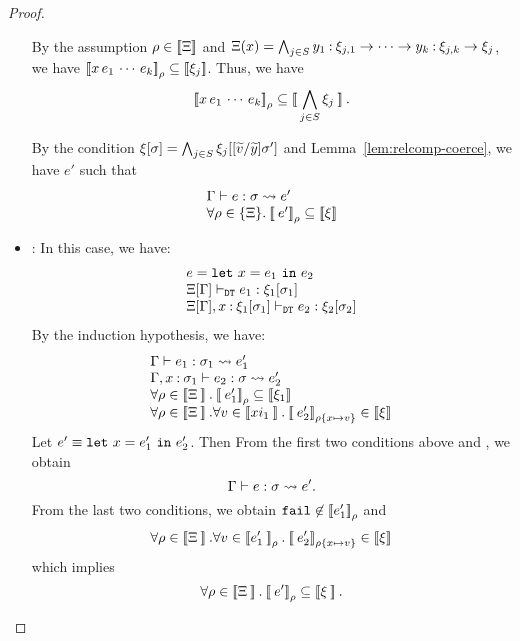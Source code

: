 \begin{proof}
\begin{itemize}
By the assumption \(\rho\in \mathbin{[\![}\Xi\mathbin{]\!]}\) and 
\(\Xi(x) = \bigwedge_{j\in S}y_1\mathbin{:}\xi_{j,1}\rightarrow \cdots \rightarrow y_k\mathbin{:}\xi_{j,k}\rightarrow \xi_j\),
we have \(\mathbin{[\![}x\, e_1\,\cdots\,e_k\mathbin{]\!]}_{\rho} \subseteq
                 \mathbin{[\![}\xi_j\mathbin{]\!]}\).
Thus, we have
\[\mathbin{[\![}x\, e_1\,\cdots\,e_k\mathbin{]\!]}_{\rho} \subseteq
                \mathbin{[\![}\bigwedge_{j\in S}\xi_j\mathbin{]\!]}.\]

By the condition \(\xi[\sigma] = \bigwedge_{j\in S} \xi_j[[\widetilde{v}/\widetilde{y}]\sigma']\)
and Lemma~\ref{lem:relcomp-coerce}, we have \(e'\) such that
\[
\begin{array}{l}
\Gamma \vdash e : \sigma \leadsto e'\\
\forall \rho\in\{\Xi\}.\mathbin{[\![}e'\mathbin{]\!]}_{\rho}\subseteq \mathbin{[\![}\xi\mathbin{]\!]}
\end{array}
\]
\item \textit{}:
In this case, we have:
\[
\begin{array}{l}
e = \mathtt{let~}x=e_1\mathtt{~in~}{e_2}\\
\Xi[\Gamma] \vdash_{\texttt{DT}} e_1: \xi_1[\sigma_1]\\
\Xi[\Gamma], x\mathbin{:}\xi_1[\sigma_1]\vdash_{\texttt{DT}} e_2: \xi_2[\sigma_2]
\end{array}
\]
By the induction hypothesis, we have:
\[
\begin{array}{l}
\T{\Gamma}{e_1}{\sigma_1}{e_1'}\\
\T{\Gamma, x\COL\sigma_1}{e_2}{\sigma}{e_2'}\\
\forall \rho\in \sem{\Xi}.\esem{e_1'}{\rho} \subseteq\sem{\xi_1}\\
\forall \rho\in \sem{\Xi}.\forall v\in \sem{xi_1}.
 \esem{e_2'}{\rho\set{x\mapsto v}}\in \sem{\xi}
\end{array}
\]
Let \(e' \equiv \mathtt{let~}x=e_1'\mathtt{~in~}{e_2'}\). Then
From the first two conditions above and , we obtain
\[ \Gamma \vdash e : \sigma \leadsto e'.\]
From the last two conditions, we obtain 
\(\mathtt{fail}\not\in \mathbin{[\![}e_1'\mathbin{]\!]}_{\rho}\) and 
\[\forall \rho\in \sem{\Xi}.\forall v\in \esem{e_1'}{\rho}. \esem{e_2'}{\rho\set{x\mapsto v}}\in \sem{\xi}\]
which implies 
\[\forall \rho\in\mathbin{[\![}\Xi\mathbin{]\!]}.\mathbin{[\![}e'\mathbin{]\!]}_{\rho}\subseteq \mathbin{[\![}\xi\mathbin{]\!]}.\]



\end{itemize}
\end{proof}
